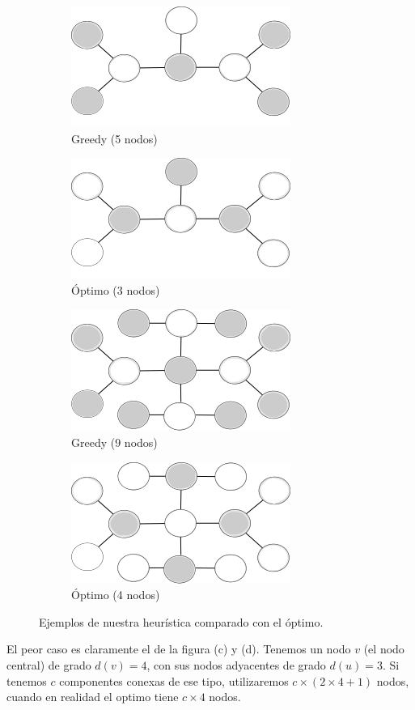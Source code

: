 \begin{figure}[ht]
\centering
\begin{subfigure}[b]{0.4\textwidth}
	\includegraphics[scale=0.6]{images/greedy_fail.png}
	\caption{Greedy (5 nodos)}
\end{subfigure}
\begin{subfigure}[b]{0.4\textwidth}
	\includegraphics[scale=0.6]{images/greedy_best.png}
	\caption{Óptimo (3 nodos)}
\end{subfigure}

\begin{subfigure}[b]{0.4\textwidth}
	\includegraphics[scale=0.6]{images/greedy_fail2.png}
	\caption{Greedy (9 nodos)}
\end{subfigure}
\begin{subfigure}[b]{0.4\textwidth}
	\includegraphics[scale=0.6]{images/greedy_best2.png}
	\caption{Óptimo (4 nodos)}
\end{subfigure}
\caption{Ejemplos de nuestra heurística comparado con el óptimo.}
\end{figure}

El peor caso es claramente el de la figura (c) y (d). Tenemos un nodo $v$ (el nodo central) de grado $d(v) = 4$, con sus nodos adyacentes de grado $d(u) = 3$. Si tenemos $c$ componentes conexas de ese tipo, utilizaremos $c \times (2 \times 4 + 1)$ nodos, cuando en realidad el optimo tiene $c \times 4$ nodos.



